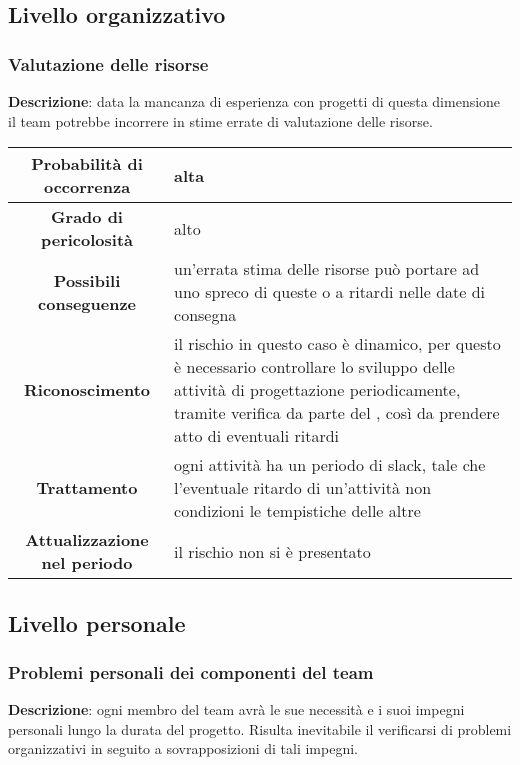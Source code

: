 \documentclass[PianoDiProgetto.tex]{subfiles}
\begin{document}
	\subsection{Livello organizzativo}
	\subsubsection{Valutazione delle risorse}
		\label{sec:lo}
		
		\textbf{Descrizione}: data la mancanza di esperienza con progetti di questa dimensione il team potrebbe incorrere in stime errate di valutazione delle risorse.
		
		\begin{center}
			\begin{tabular}{ | c | p{10cm} |}
				\hline
				\textbf{Probabilità di occorrenza} & alta  \\ \hline
				\textbf{Grado di pericolosità} & alto \\ \hline
				\textbf{Possibili conseguenze} & un'errata stima delle risorse può portare ad uno spreco di queste o a ritardi nelle date di consegna \\ \hline
				\textbf{Riconoscimento} & il rischio in questo caso è dinamico, per questo è necessario controllare lo sviluppo delle attività di progettazione periodicamente, tramite  verifica da parte del \RESP{}, così da prendere atto di eventuali ritardi \\ \hline
				\textbf{Trattamento} & ogni attività ha un periodo di slack, tale che l'eventuale ritardo di un'attività non condizioni le tempistiche delle altre \\ \hline
				\textbf{Attualizzazione nel periodo} &  il rischio non si è presentato \\
				\hline	
			\end{tabular}
		\end{center}	
	
	\subsection{Livello personale}
		\subsubsection{Problemi personali dei componenti del team}
			\label{sec:ppdct}
		
		\textbf{Descrizione}: ogni membro del team avrà le sue necessità e i suoi impegni personali lungo la durata del progetto. Risulta inevitabile il verificarsi di problemi organizzativi in seguito a sovrapposizioni di tali impegni.
			
\end{document}
